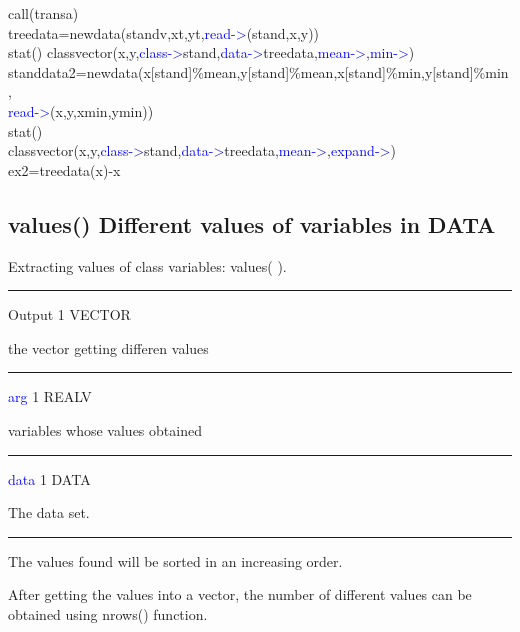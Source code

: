 \begin{example}[classdata]
\textcolor{VioletRed}{call}(transa)\\
treedata=\textcolor{VioletRed}{newdata}(standv,xt,yt,\textcolor{blue}{read->}(stand,x,y))\\
\textcolor{VioletRed}{stat}()
\textcolor{VioletRed}{classvector}(x,y,\textcolor{blue}{class->}stand,\textcolor{blue}{data->}treedata,\textcolor{blue}{mean->},\textcolor{blue}{min->})\\
standdata2=\textcolor{VioletRed}{newdata}(x[stand]\%mean,y[stand]\%mean,x[stand]\%min,y[stand]\%min,\\
\textcolor{blue}{read->}(x,y,xmin,ymin))\\
\textcolor{VioletRed}{stat}()\\
\textcolor{VioletRed}{classvector}(x,y,\textcolor{blue}{class->}stand,\textcolor{blue}{data->}treedata,\textcolor{blue}{mean->},\textcolor{blue}{expand->})\\
ex2=treedata(x)-x




\end{example}

\subsection{\textcolor{VioletRed}{values}() Different values of variables in DATA}
\label{values}
Extracting values of class variables: \textcolor{VioletRed}{values}( ).
\vspace{0.3cm}
\hrule
\vspace{0.3cm}
\noindent Output \tabto{3cm} 1 \tabto{5cm}  VECTOR \tabto{7cm}
\begin{changemargin}{3cm}{0cm}
\noindent  the vector getting differen values
\end{changemargin}
\vspace{0.3cm}
\hrule
\vspace{0.3cm}
\noindent \textcolor{blue}{arg} \tabto{3cm} 1 \tabto{5cm}  REALV \tabto{7cm}
\begin{changemargin}{3cm}{0cm}
\noindent  variables whose values obtained
\end{changemargin}
\vspace{0.3cm}
\hrule
\vspace{0.3cm}
\noindent \textcolor{blue}{data} \tabto{3cm} 1 \tabto{5cm}  DATA \tabto{7cm}
\begin{changemargin}{3cm}{0cm}
\noindent  The data set.
\end {changemargin}
\hrule
\vspace{0.2cm}
\begin{note}
The values found will be sorted in an increasing order.
\end{note}
\begin{note}
After getting the values into a vector,
the number of different values can be obtained
using \textcolor{VioletRed}{nrows}() function.
\end{note}

